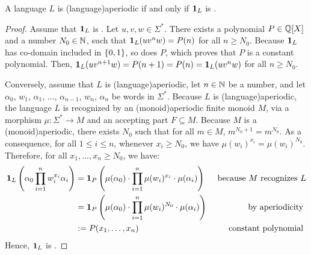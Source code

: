 \begin{example}[restate=aperidic-ultimately-polynomial:ex,label=aperidic-ultimately-polynomial:ex]
    A language $L$ is \kl(language){aperiodic} if and only if 
    $\mathbf{1}_{L}$ is .
\end{example}
\begin{proof}
    Assume that $\mathbf{1}_{L}$ is . Let $u,v,w \in
    \Sigma^*$. There exists a polynomial $P \in \mathbb{Q}[X]$ and a number $N_0 \in
    \mathbb{N}$, such that $\mathbf{1}_{L}(u v^n w) = P(n)$ for all $n \geq N_0$. Because
    $\mathbf{1}_{L}$ has co-domain included in $\mathopen{\{} 0,1 \mathclose{\}}$, so does $P$, which proves
    that $P$ is a constant polynomial. Then, $\mathbf{1}_{L}(u v^{n+1} w) = P(n+1) =
    P(n) = \mathbf{1}_{L}(uv^n w)$ for all $n \geq N_0$.

    Conversely, assume that $L$ is \kl(language){aperiodic}, let $n \in \mathbb{N}$ be a number, and
    let $\alpha_0$, $w_1$, $\alpha_1$, $\ldots$, $\alpha_{n-1}$, $w_n$, $\alpha_n$
    be words in $\Sigma^*$. Because $L$ is \kl(language){aperiodic}, the language
    $L$ is recognized by an \kl(monoid){aperiodic} finite monoid $M$, via a
    morphism $\mu \colon \Sigma^* \to M$ and an accepting part $F \subseteq M$.
    Because $M$ is a \kl(monoid){aperiodic}, there exists $N_0$
    such that for all $m \in M$, $m^{N_0+1} = m^{N_0}$. As a consequence,
    for all $1 \leq i \leq n$,
    whenever $x_i \geq N_0$, we have $\mu(w_i)^{x_i} = \mu(w_i)^{N_0}$.
    Therefore, for all $x_1, \dots, x_n \geq N_0$, we have:
    \begin{align*}
        \mathbf{1}_{L}\left(\alpha_0 \prod_{i= 1}^n w_i^{x_i} \alpha_i \right) 
        &= 
        \mathbf{1}_{P}\left(\mu(\alpha_0) \cdot \prod_{i= 1}^n \mu(w_i)^{x_i} \cdot \mu(\alpha_i)\right)
        & \text{ because $M$ recognizes $L$}
        \\
        &= 
        \mathbf{1}_{P}\left(\mu(\alpha_0) \cdot \prod_{i= 1}^n \mu(w_i)^{N_0} \cdot \mu(\alpha_i)\right)
        & \text{ by aperiodicity }
        \\
        &\mathrel{:=} P(x_1, \dots, x_n) & \text{ constant polynomial }
    \end{align*}
    Hence, $\mathbf{1}_{L}$ is .
\end{proof}

